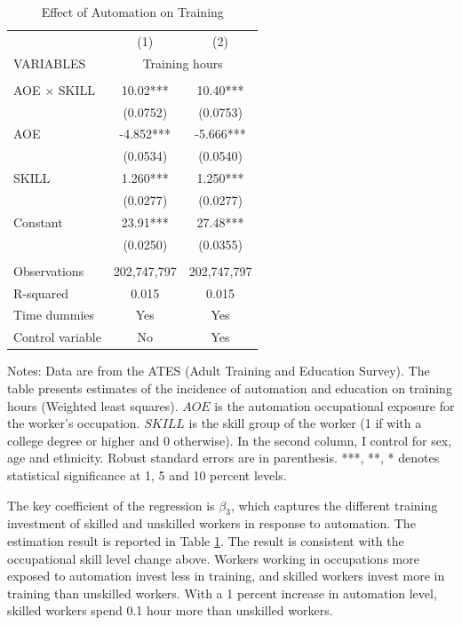 \documentclass[12pt]{article}
\begin{document}
\begin{table}[h!]
\begin{center}
\scriptsize
\begin{tabular}{lcc} \hline \hline
 & (1) & (2) \\
VARIABLES & \multicolumn{2}{c}{Training hours} \\ \hline
 &  &  \\
 AOE $\times$ SKILL& 10.02*** & 10.40*** \\
 & (0.0752) & (0.0753) \\
AOE & -4.852*** & -5.666*** \\
 & (0.0534) & (0.0540) \\
SKILL & 1.260*** & 1.250*** \\
 & (0.0277) & (0.0277) \\
Constant & 23.91*** & 27.48*** \\
 & (0.0250) & (0.0355) \\
 &  &  \\
Observations & 202,747,797 & 202,747,797 \\
 R-squared & 0.015 & 0.015 \\
  Time dummies & Yes & Yes \\
 Control variable & No & Yes \\  \hline
\end{tabular}
\end{center}
\caption{Effect of Automation on Training}
\label{estimation5}
{\scriptsize Notes: Data are from the ATES (Adult Training and Education Survey). The table presents estimates of the incidence of automation and education on training hours (Weighted least squares). $AOE$ is the automation occupational exposure for the worker's occupation. $SKILL$ is the skill group of the worker (1 if with a college degree or higher and 0 otherwise). In the second column, I control for sex, age and ethnicity. Robust standard errors are in parenthesis. ***, **, * denotes statistical significance at 1, 5 and 10 percent levels.}
\end{table}

The key coefficient of the regression is $\beta_3$, which captures the different training investment of skilled and unskilled workers in response to automation. The estimation result is reported in Table \ref{estimation5}. The result is consistent with the occupational skill level change above. Workers working in occupations more exposed to automation invest less in training, and skilled workers invest more in training than unskilled workers. With a 1 percent increase in automation level, skilled workers spend 0.1 hour more than unskilled workers. 
\end{document}
